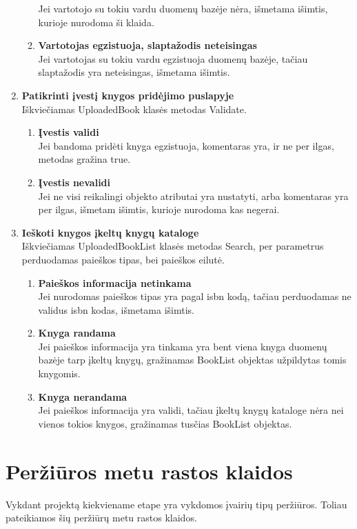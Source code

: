 \documentclass{VUMIFPSkursinis}
\begin{document}
\begin{enumerate}[label=\textbf{T\arabic*}]
\begin{enumerate}[label*=\textbf{.\arabic*}]
						Jei vartotojo su tokiu vardu duomenų bazėje nėra, 
						išmetama išimtis, kurioje nurodoma ši klaida.
					\item \textbf{Vartotojas egzistuoja, slaptažodis neteisingas}\\
						Jei vartotojas su tokiu vardu egzistuoja duomenų bazėje, 
						tačiau slaptažodis yra neteisingas, išmetama išimtis.
				\end{enumerate}
			\item \textbf{Patikrinti įvestį knygos pridėjimo puslapyje}\\
				Iškviečiamas UploadedBook klasės metodas Validate.
				\begin{enumerate}[label*=\textbf{.\arabic*}]
					\item \textbf{Įvestis validi}\\
						Jei bandoma pridėti knyga egzistuoja, komentaras yra, 
						ir ne per ilgas, metodas gražina true.
					\item \textbf{Įvestis nevalidi}\\
						Jei ne visi reikalingi objekto atributai yra nustatyti,
						arba komentaras yra per ilgas, išmetam išimtis, kurioje nurodoma kas negerai.
				\end{enumerate}
			\item \textbf{Ieškoti knygos įkeltų knygų kataloge}\\
				Iškviečiamas UploadedBookList klasės metodas Search, per parametrus perduodamas paieškos tipas,
				bei paieškos eilutė.
				\begin{enumerate}[label*=\textbf{.\arabic*}]
					\item \textbf{Paieškos informacija netinkama}\\
						Jei nurodomas paieškos tipas yra pagal isbn kodą, tačiau perduodamas ne validus isbn
						kodas, išmetama išimtis.
					\item \textbf{Knyga randama}\\
						Jei paieškos informacija yra tinkama yra bent viena knyga duomenų bazėje tarp įkeltų knygų,
						gražinamas BookList objektas užpildytas tomis knygomis.
					\item \textbf{Knyga nerandama}\\
						Jei paieškos informacija yra validi, tačiau įkeltų knygų kataloge nėra nei vienos tokios knygos,
						gražinamas tusčias BookList objektas.
				\end{enumerate}
		\end{enumerate}

\section{Peržiūros metu rastos klaidos}
	Vykdant projektą kiekviename etape yra vykdomos įvairių tipų peržiūros.
	Toliau pateikiamos šių peržiūrų metu rastos klaidos.
\end{document}
